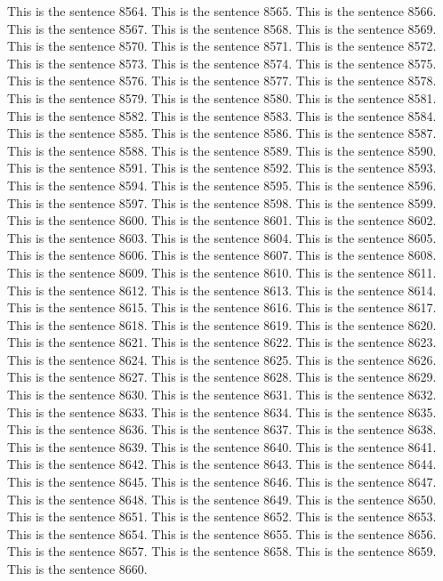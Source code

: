\documentclass{article}
\begin{document}
This is the sentence 8564.
This is the sentence 8565.
This is the sentence 8566.
This is the sentence 8567.
This is the sentence 8568.
This is the sentence 8569.
This is the sentence 8570.
This is the sentence 8571.
This is the sentence 8572.
This is the sentence 8573.
This is the sentence 8574.
This is the sentence 8575.
This is the sentence 8576.
This is the sentence 8577.
This is the sentence 8578.
This is the sentence 8579.
This is the sentence 8580.
This is the sentence 8581.
This is the sentence 8582.
This is the sentence 8583.
This is the sentence 8584.
This is the sentence 8585.
This is the sentence 8586.
This is the sentence 8587.
This is the sentence 8588.
This is the sentence 8589.
This is the sentence 8590.
This is the sentence 8591.
This is the sentence 8592.
This is the sentence 8593.
This is the sentence 8594.
This is the sentence 8595.
This is the sentence 8596.
This is the sentence 8597.
This is the sentence 8598.
This is the sentence 8599.
This is the sentence 8600.
This is the sentence 8601.
This is the sentence 8602.
This is the sentence 8603.
This is the sentence 8604.
This is the sentence 8605.
This is the sentence 8606.
This is the sentence 8607.
This is the sentence 8608.
This is the sentence 8609.
This is the sentence 8610.
This is the sentence 8611.
This is the sentence 8612.
This is the sentence 8613.
This is the sentence 8614.
This is the sentence 8615.
This is the sentence 8616.
This is the sentence 8617.
This is the sentence 8618.
This is the sentence 8619.
This is the sentence 8620.
This is the sentence 8621.
This is the sentence 8622.
This is the sentence 8623.
This is the sentence 8624.
This is the sentence 8625.
This is the sentence 8626.
This is the sentence 8627.
This is the sentence 8628.
This is the sentence 8629.
This is the sentence 8630.
This is the sentence 8631.
This is the sentence 8632.
This is the sentence 8633.
This is the sentence 8634.
This is the sentence 8635.
This is the sentence 8636.
This is the sentence 8637.
This is the sentence 8638.
This is the sentence 8639.
This is the sentence 8640.
This is the sentence 8641.
This is the sentence 8642.
This is the sentence 8643.
This is the sentence 8644.
This is the sentence 8645.
This is the sentence 8646.
This is the sentence 8647.
This is the sentence 8648.
This is the sentence 8649.
This is the sentence 8650.
This is the sentence 8651.
This is the sentence 8652.
This is the sentence 8653.
This is the sentence 8654.
This is the sentence 8655.
This is the sentence 8656.
This is the sentence 8657.
This is the sentence 8658.
This is the sentence 8659.
This is the sentence 8660.
\end{document}
